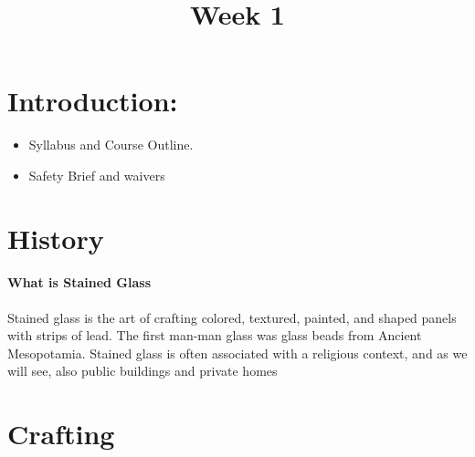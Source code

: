 \documentclass[11pt]{article}
\title{Week 1}
\date{}
\begin{document}
    \maketitle


    \section*{Introduction:}
        \begin{itemize}
            \item Syllabus and Course Outline.
            \item Safety Brief and waivers
        \end{itemize}


    \section*{History}
        \paragraph{What is Stained Glass}
            \newline
            Stained glass is the art of crafting colored, textured, painted, and shaped panels with strips of lead.
            The first man-man glass was glass beads from Ancient Mesopotamia.
            Stained glass is often associated with a religious context, and as we will see, also public buildings and private homes
        \paragraph{}



    \section*{Crafting}
        \begin{itemize}
        \end{itemize}
\end{document}
